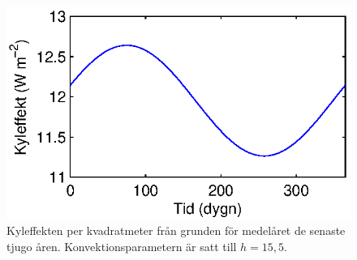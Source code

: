 \begin{figure}
\centering
\includegraphics{images/groundcool.eps}
\caption{\label{fig:cooling_ground}
Kyleffekten per kvadratmeter från grunden för medelåret de senaste tjugo åren. Konvektionsparametern är satt till $h=15,5$. }

\end{figure}




